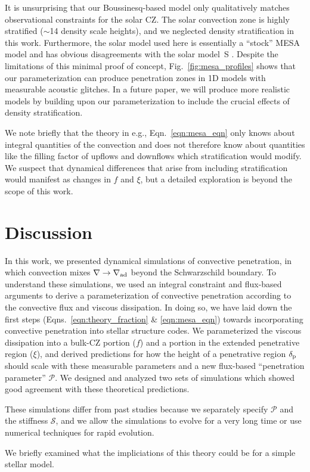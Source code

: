 \documentclass[twocolumn, linenumbers]{aastex631}
\newcommand{\gradad}{\ensuremath{\nabla_{\rm{ad}}}}
\newcommand{\justgrad}{\ensuremath{\nabla}}
\newcommand{\delp}{\ensuremath{\delta_{\rm{p}}}}
\newcommand{\mP}{\ensuremath{\mathcal{P}}}
\newcommand{\mS}{\ensuremath{\mathcal{S}}}
\newcommand{\editone}[1]{#1}
\begin{document}
It is unsurprising that our Boussinesq-based model only qualitatively matches observational constraints for the solar CZ.
The solar convection zone is highly stratified ($\sim$14 density scale heights), and we neglected density stratification in this work.
Furthermore, the solar model used here is essentially a ``stock'' MESA model and has obvious disagreements with the solar model~S \citep[see Fig.~1 in][where the Schwarzschild base of the CZ is $r/R_\odot \approx 0.712$, whereas the one in Fig.~\ref{fig:mesa_profiles} is at $r/R_{\odot} \approx 0.75$]{christensen-dalsgaard_etal_2011}.
Despite the limitations of this minimal proof of concept, Fig.~\ref{fig:mesa_profiles} shows that our parameterization can produce penetration zones in 1D models with measurable acoustic glitches.
In a future paper, we will produce more realistic models by building upon our parameterization to include the crucial effects of density stratification.
\editone{
    We note briefly that the theory in e.g., Eqn.~\ref{eqn:mesa_eqn} only knows about integral quantities of the convection and does not therefore know about quantities like the filling factor of upflows and downflows which stratification would modify.
    We suspect that dynamical differences that arise from including stratification would manifest as changes in $f$ and $\xi$, but a detailed exploration is beyond the scope of this work.
}


\section{Discussion}
\label{sec:discussion}
In this work, we presented dynamical simulations of convective penetration, in which convection mixes ${\justgrad \rightarrow \gradad}$ beyond the Schwarzschild boundary.
To understand these simulations, we used an integral constraint \citep[reminiscent of][]{roxburgh1989} and flux-based arguments \citep[similar to][]{zahn1991} to derive a parameterization of convective penetration according to the convective flux and viscous dissipation.
In doing so, we have laid down the first steps (Eqns.~\ref{eqn:theory_fraction} \& \ref{eqn:mesa_eqn}) towards incorporating convective penetration into stellar structure codes.
We parameterized the viscous dissipation into a bulk-CZ portion ($f$) and a portion in the extended penetrative region ($\xi$), and derived predictions for how the height of a penetrative region $\delp$ should scale with these measurable parameters and a new flux-based ``penetration parameter'' $\mP$.
We designed and analyzed two sets of simulations which showed good agreement with these theoretical predictions.
\editone{
    These simulations differ from past studies because we separately specify $\mP$ and the stiffness $\mS$, and we allow the simulations to evolve for a very long time or use numerical techniques for rapid evolution.
}
We briefly examined what the impliciations of this theory could be for a simple stellar model.
\end{document}
